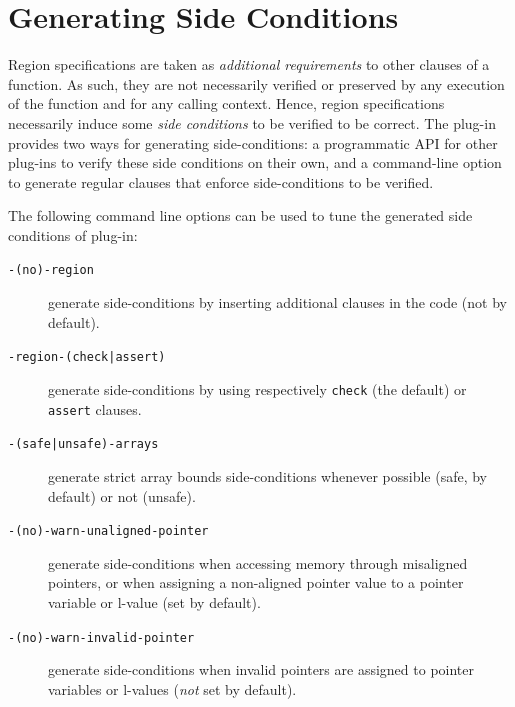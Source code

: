 \pagebreak
\section{Generating Side Conditions}
\label{toc:commandline}

Region specifications are taken as \emph{additional requirements} to other
\acsl clauses of a function. As such, they are not necessarily verified
or preserved by any execution of the function and for any calling context.
Hence, region specifications necessarily induce some \emph{side conditions} to
be verified to be correct. The \Region plug-in provides two ways for
generating side-conditions: a programmatic \textsf{API} for other
\FramaC plug-ins to verify these side conditions on their own, and a
command-line option to generate regular \acsl clauses that enforce
side-conditions to be verified.

The following command line options can be used to tune the generated side
conditions of \Region plug-in:

\begin{description}
\item[\texttt{-(no)-region}] generate side-conditions by inserting additional
  \acsl clauses in the code (not by default).
\item[\texttt{-region-(check|assert)}] generate side-conditions by using respectively
  \verb+check+ (the default) or \verb+assert+ clauses.
\item[\texttt{-(safe|unsafe)-arrays}] generate strict array bounds
  side-conditions whenever possible (safe, by default) or not (unsafe).
\item[\texttt{-(no)-warn-unaligned-pointer}] generate side-conditions when
  accessing memory through misaligned pointers, or when assigning a non-aligned
  pointer value to a pointer variable or l-value (set by default).
\item[\texttt{-(no)-warn-invalid-pointer}] generate side-conditions when invalid
  pointers are assigned to pointer variables or l-values (\emph{not} set by
  default).
\end{description}
